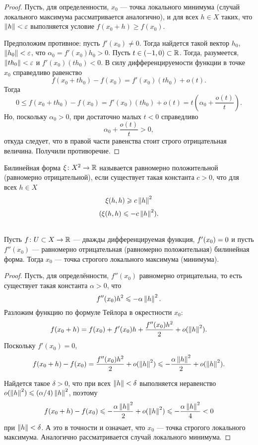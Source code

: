 \begin{proof}
    Пусть, для определенности, $x_0$ --- точка локального минимума (случай локального максимума
    рассматривается аналогично), и для всех $h \in X$ таких, что $\left\|h\right\| < \varepsilon$ 
    выполняется условие $f(x_0 + h) \geq f(x_0)$.

    Предположим противное: пусть $f'(x_0) \neq 0$. Тогда найдется такой вектор $h_0$, 
    $\left\|h_0\right\| < \varepsilon$, что $\alpha_0 = f'(x_0)h_0 > 0$. Пусть 
    $t \in (-1, 0) \subset \mathbb{R}$.
    Тогда, разумеется, $\left\|t h_0\right\| < \varepsilon$ и $f'(x_0)(th_0) < 0$.
    В силу дифференцируемости функции в точке $x_0$ справедливо равенство
    \[ f(x_0 + t h_0) - f(x_0) = f'(x_0)(th_0) + o(t). \]
    Тогда
    \[ 0 \leq f(x_0 + t h_0) - f(x_0) = f'(x_0)(t h_0) + o(t) = t \left( \alpha_0 +
         \frac{o(t)}{t} \right). \]
    Но, поскольку $\alpha_0 > 0$, при достаточно малых $t < 0$ справедливо
    \[ \alpha_0 + \frac{o(t)}{t} > 0, \]
    откуда следует, что в правой части равенства стоит строго отрицательная величина. 
    Получили противоречие.
\end{proof}

\begin{definition}
    Билинейная форма $\xi \colon X^2 \to \mathbb{R}$ называется равномерно положительной (равномерно
    отрицательной), если существует такая константа $c > 0$, что для всех $h \in X$
    \[ \xi(h, h) \geqslant c \left\|h\right\|^2 \]
    \[ (\xi(h, h) \leqslant -c \left\|h\right\|^2). \]
\end{definition}

\begin{theorem}\hfill\\
    \indent Пусть $f \colon U \subset X \to \mathbb{R}$ --- дважды дифференцируемая функция, 
    $f'(x_0) \hm= 0$
    и пусть $f''(x_0)$ --- равномерно отрицательная (равномерно положительная) билинейная форма.
    Тогда $x_0$ --- точка строгого локального максимума (минимума).
\end{theorem}

\begin{proof}
    Пусть, для определённости, $f''(x_0)$ равномерно отрицательна, 
    то есть существует такая константа $\alpha > 0$, что
    \[ f''(x_0)h^2 \leqslant -\alpha\left\|h\right\|^2. \]
    Разложим функцию по формуле Тейлора в окрестности $x_0$:
    \[ f(x_0+h) = f(x_0) + f'(x_0)h + \frac{f''(x_0)h^2}{2} + o(\left\|h\right\|^2). \]
    Поскольку $f'(x_0) = 0$,
    \[ f(x_0+h) - f(x_0) = \frac{f''(x_0)h^2}{2} + o(\left\|h\right\|^2) \leqslant 
        -\frac{\alpha \left\|h\right\|^2}{2} + o(\left\|h\right\|^2). \]

    Найдется такое $\delta > 0$, что при всех $\left\|h\right\| < \delta$ выполняется 
    неравенство $o(\norm{h}^2) \hm\leq (\alpha/4)\norm{h}^2$, поэтому
    \[ f(x_0+h) - f(x_0) \leqslant -\frac{\alpha \left\|h\right\|^2}{2} + o(\left\|h\right\|^2) \leqslant 
        -\frac{\alpha \left\|h\right\|^2}{4} < 0 \]
    при $\left\|h\right\| < \delta$. А это в точности и означает, что $x_0$ --- точка строгого 
    локального максимума. Аналогично рассматривается случай локального минимума.
\end{proof}

